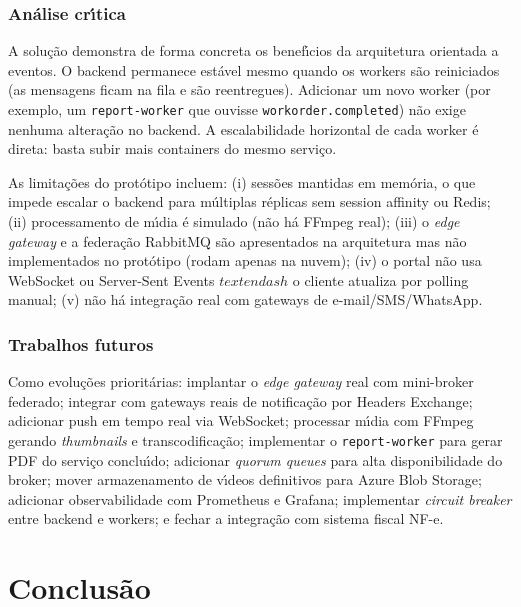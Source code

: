 \documentclass[10pt,a4paper]{article}
\begin{document}
\subsubsection*{An\'alise cr\'\i tica}

A solu\c{c}\~ao demonstra de forma concreta os benef\'\i cios da arquitetura orientada a eventos. O backend permanece est\'avel mesmo quando os workers s\~ao reiniciados (as mensagens ficam na fila e s\~ao reentregues). Adicionar um novo worker (por exemplo, um \texttt{report-worker} que ouvisse \texttt{workorder.completed}) n\~ao exige nenhuma altera\c{c}\~ao no backend. A escalabilidade horizontal de cada worker \'e direta: basta subir mais containers do mesmo servi\c{c}o.

As limita\c{c}\~oes do prot\'otipo incluem: (i) sess\~oes mantidas em mem\'oria, o que impede escalar o backend para m\'ultiplas r\'eplicas sem session affinity ou Redis; (ii) processamento de m\'\i dia \'e simulado (n\~ao h\'a FFmpeg real); (iii) o \emph{edge gateway} e a federa\c{c}\~ao RabbitMQ s\~ao apresentados na arquitetura mas n\~ao implementados no prot\'otipo (rodam apenas na nuvem); (iv) o portal n\~ao usa WebSocket ou Server-Sent Events \(textendash\) o cliente atualiza por polling manual; (v) n\~ao h\'a integra\c{c}\~ao real com gateways de e-mail/SMS/WhatsApp.

\subsubsection*{Trabalhos futuros}

Como evolu\c{c}\~oes priorit\'arias: implantar o \emph{edge gateway} real com mini-broker federado; integrar com gateways reais de notifica\c{c}\~ao por Headers Exchange; adicionar push em tempo real via WebSocket; processar m\'\i dia com FFmpeg gerando \emph{thumbnails} e transcodifica\c{c}\~ao; implementar o \texttt{report-worker} para gerar PDF do servi\c{c}o conclu\'\i do; adicionar \emph{quorum queues} para alta disponibilidade do broker; mover armazenamento de v\'\i deos definitivos para Azure Blob Storage; adicionar observabilidade com Prometheus e Grafana; implementar \emph{circuit breaker} entre backend e workers; e fechar a integra\c{c}\~ao com sistema fiscal NF-e.

\section{Conclus\~ao}
\end{document}
